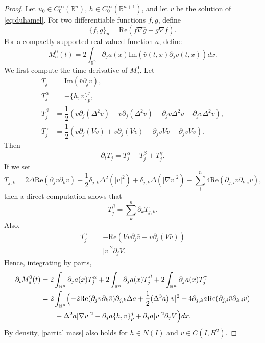 \documentclass[11pt,a4paper]{article}
\numberwithin{equation}{section}
\begin{document}
\begin{proof}
Let $u_{0} \in C_{0}^{\infty}(\mathbb{R}^{n})$, $h \in C_{0}^{\infty}(\mathbb{R}^{n + 1})$, and let $v$ be the solution of \eqref{eq:duhamel}.
For two differentiable functions $f,g$, define
\begin{equation}
\{f, g\}_{p} = \text{Re}(f\nabla \bar{g} - g \nabla \bar{f}).
\end{equation}
For a compactly supported real-valued function $a$, define
\begin{equation}\label{def local mass}
M_{a}^{0}(t) = 2 \int_{\mathbb{R}^{n}} \partial_{j}a(x)\text{Im}(\bar{v}(t,x)\partial_{j}v(t, x))dx.
\end{equation}
We first compute the time derivative of $M_{a}^{0}$.
Let
\begin{align*}
T_{j} &= \text{Im}(\bar{v}\partial_{j}v), \\
T_{j}^{\alpha} &= - \{h, v \}^{j}_{p}, \\
T_{j}^{\beta} &= \dfrac{1}{2}\left(\bar{v}\partial_{j}(\Delta^{2}v) + v\partial_{j}(\Delta^{2}\bar{v}) -\partial_{j}v\Delta^{2}\bar{v} - \partial_{j}\bar{v}\Delta^{2}v\right), \\
T_{j}^{\gamma} &= \dfrac{1}{2}\left(\bar{v}\partial_{j}(Vv) + v\partial_{j}(V\bar{v}) -\partial_{j}vV\bar{v} - \partial_{j}\bar{v}Vv\right).
\end{align*}
Then
\[
 \partial_{t}T_{j} = T_{j}^{\alpha} + T_{j}^{\beta} + T_{j}^{\gamma}.
\]
If we set
\[
T_{j,k} = 2\Delta\text{Re}(\partial_{j}v\partial_{k}\bar{v}) - \dfrac{1}{2}\delta_{j,k}\Delta^{2}(|v|^{2}) + \delta_{j,k}\Delta(|\nabla v|^{2}) - \sum_{i}^{n}4\text{Re}(\partial_{j,i}\bar{v}\partial_{k,i}v),
\]
then a direct computation shows that
\[
T_{j}^{\beta} = \sum_{k}^{n}\partial_{k}T_{j,k}.
\]
Also,
\begin{align*}
T_{j}^{\gamma}
&= -\text{Re}(Vv \partial_{j} \bar{v} - v\partial_{j}(V\bar{v})) \\
&= |v|^{2}\partial_{j} V.
\end{align*}
Hence, integrating by parts,
\begin{equation}\label{partial mass}
\begin{aligned}
\partial_{t} M_{a}^{0} (t)
&= 2\int_{\mathbb{R}^{n}} \partial_{j}a(x)T_{j}^{\alpha} + 2\int_{\mathbb{R}^{n}} \partial_{j}a(x)T_{j}^{\beta} + 2\int_{\mathbb{R}^{n}} \partial_{j}a(x)T_{j}^{\gamma} \\
&= 2\int_{\mathbb{R}^{n}}\Bigl( - 2\text{Re}(\partial_{j}v\partial_{k}\bar{v}) \partial_{j,k}\Delta a + \dfrac{1}{2}(\Delta^{3}a)|v|^{2}
+ 4\partial_{j,k}a\text{Re}(\partial_{j,i}\bar{v}\partial_{k,i}v) \\
&\qquad -\Delta^{2}a|\nabla v|^{2}
- \partial_{j}a \{h, v \}^{j}_{p} + \partial_{j}a |v|^{2}\partial_{j} V\Bigr)dx.
\end{aligned}
\end{equation}
By density, \eqref{partial mass} also holds for $h\in N(I)$ and $v\in C(I,H^{2})$.


\end{proof}
\end{document}
